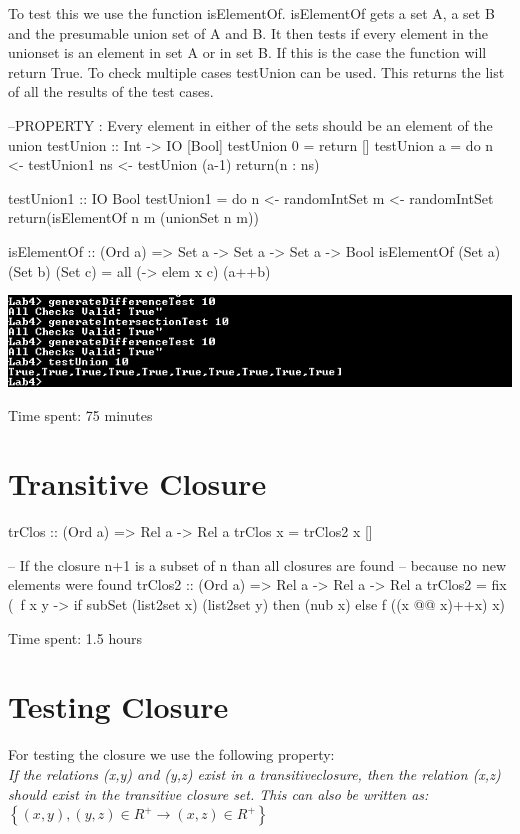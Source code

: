 \documentclass{article}
\begin{document}
To test this we use the function isElementOf. isElementOf gets a set A, a set B and the presumable union set of A and B. It then tests if every element in the unionset is an element in set A or in set B. If this is the case the function will return True. To check multiple cases testUnion can be used. This returns the list of all the results of the test cases.

\begin{code}
--PROPERTY : Every element in either of the sets should be an element of the union
testUnion :: Int -> IO [Bool]
testUnion 0 = return []
testUnion a = do 	n <- testUnion1
			ns <- testUnion (a-1)			
			return(n : ns)

testUnion1 :: IO Bool
testUnion1 = do 	n <- randomIntSet
			m <- randomIntSet
			return(isElementOf n m (unionSet n m)) 

isElementOf :: (Ord a) => Set a -> Set a -> Set a -> Bool
isElementOf (Set a) (Set b) (Set c) = all (\x -> elem x c) (a++b)
\end{code}

\includegraphics{knipsel}

\newpage
Time spent: 75 minutes

\section*{Transitive Closure}
\begin{code}
trClos :: (Ord a) => Rel a -> Rel a
trClos x = trClos2 x []

-- If the closure n+1 is a subset of n than all closures are found
-- because no new elements were found
trClos2 :: (Ord a) => Rel a -> Rel a -> Rel a
trClos2  = fix (\ f x y ->
           if subSet (list2set x) (list2set y) then (nub x)
           else f ((x @@ x)++x) x) 
\end{code}

Time spent: 1.5 hours

\section*{Testing Closure}
For testing the closure we use the following property: \\
\emph{If the relations (x,y) and (y,z) exist in a transitiveclosure, then the relation (x,z) should exist in the transitive closure set. This can also be written as: \\
$\left\{ (x,y) , (y,z) \in R^+ \rightarrow(x,z) \in R^+ \right\}$}\\
\end{document}
